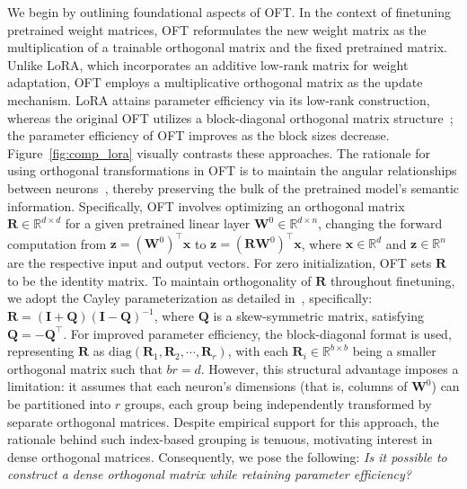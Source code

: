 We begin by outlining foundational aspects of OFT. In the context of finetuning pretrained weight matrices, OFT reformulates the new weight matrix as the multiplication of a trainable orthogonal matrix and the fixed pretrained matrix. Unlike LoRA, which incorporates an additive low-rank matrix for weight adaptation, OFT employs a multiplicative orthogonal matrix as the update mechanism. LoRA attains parameter efficiency via its low-rank construction, whereas the original OFT utilizes a block-diagonal orthogonal matrix structure~\cite{qiu2023controlling}; the parameter efficiency of OFT improves as the block sizes decrease. Figure~\ref{fig:comp_lora} visually contrasts these approaches. The rationale for using orthogonal transformations in OFT is to maintain the angular relationships between neurons~\cite{liu2018learning,liu2021orthogonal,qiu2023controlling}, thereby preserving the bulk of the pretrained model’s semantic information. Specifically, OFT involves optimizing an orthogonal matrix $\bm{R}\in\mathbb{R}^{d\times d}$ for a given pretrained linear layer $\bm{W}^0\in\mathbb{R}^{d\times n}$, changing the forward computation from $\bm{z}=(\bm{W}^0)^\top\bm{x}$ to $\bm{z}=(\bm{R}\bm{W}^0)^\top\bm{x}$, where $\bm{x}\in\mathbb{R}^{d}$ and $\bm{z}\in\mathbb{R}^{n}$ are the respective input and output vectors. For zero initialization, OFT sets $\bm{R}$ to be the identity matrix. To maintain orthogonality of $\bm{R}$ throughout finetuning, we adopt the Cayley parameterization as detailed in~\cite{qiu2023controlling,liu2021orthogonal}, specifically: $\bm{R}=(\bm{I}+\bm{Q})(\bm{I}-\bm{Q})^{-1}$, where $\bm{Q}$ is a skew-symmetric matrix, satisfying $\bm{Q}=-\bm{Q}^\top$. For improved parameter efficiency, the block-diagonal format is used, representing $\bm{R}$ as $\text{diag}(\bm{R}_1,\bm{R}_2,\cdots,\bm{R}_r)$, with each $\bm{R}_i\in\mathbb{R}^{b\times b}$ being a smaller orthogonal matrix such that $br=d$. However, this structural advantage imposes a limitation: it assumes that each neuron's dimensions (that is, columns of $\bm{W}^0$) can be partitioned into $r$ groups, each group being independently transformed by separate orthogonal matrices. Despite empirical support for this approach, the rationale behind such index-based grouping is tenuous, motivating interest in dense orthogonal matrices. Consequently, we pose the following: \emph{Is it possible to construct a dense orthogonal matrix while retaining parameter efficiency?}

